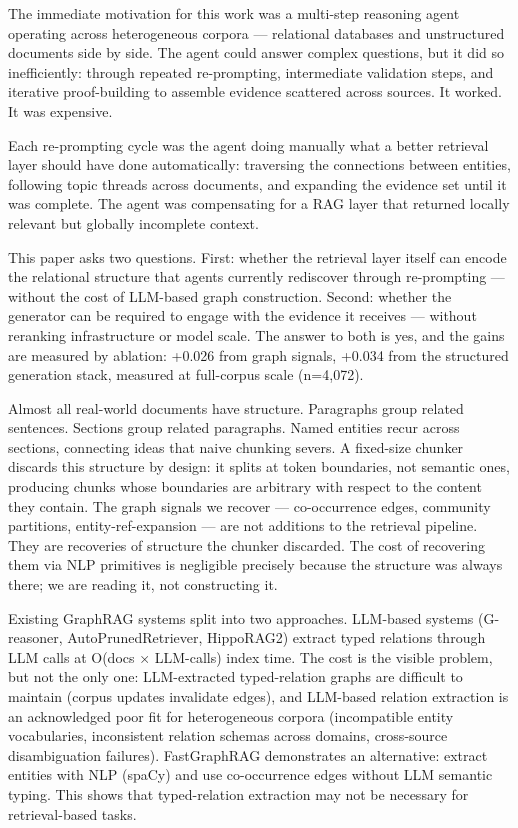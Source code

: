 The immediate motivation for this work was a multi-step reasoning agent operating across heterogeneous corpora --- relational databases and unstructured documents side by side. The agent could answer complex questions, but it did so inefficiently: through repeated re-prompting, intermediate validation steps, and iterative proof-building to assemble evidence scattered across sources. It worked. It was expensive.

Each re-prompting cycle was the agent doing manually what a better retrieval layer should have done automatically: traversing the connections between entities, following topic threads across documents, and expanding the evidence set until it was complete. The agent was compensating for a RAG layer that returned locally relevant but globally incomplete context.

This paper asks two questions. First: whether the retrieval layer itself can encode the relational structure that agents currently rediscover through re-prompting --- without the cost of LLM-based graph construction. Second: whether the generator can be required to engage with the evidence it receives --- without reranking infrastructure or model scale. The answer to both is yes, and the gains are measured by ablation: +0.026 from graph signals, +0.034 from the structured generation stack, measured at full-corpus scale (n=4,072).

Almost all real-world documents have structure. Paragraphs group related sentences. Sections group related paragraphs. Named entities recur across sections, connecting ideas that naive chunking severs. A fixed-size chunker discards this structure by design: it splits at token boundaries, not semantic ones, producing chunks whose boundaries are arbitrary with respect to the content they contain. The graph signals we recover --- co-occurrence edges, community partitions, entity-ref-expansion --- are not additions to the retrieval pipeline. They are recoveries of structure the chunker discarded. The cost of recovering them via NLP primitives is negligible precisely because the structure was always there; we are reading it, not constructing it.

Existing GraphRAG systems split into two approaches. LLM-based systems (G-reasoner, AutoPrunedRetriever, HippoRAG2) extract typed relations through LLM calls at O(docs × LLM-calls) index time. The cost is the visible problem, but not the only one: LLM-extracted typed-relation graphs are difficult to maintain (corpus updates invalidate edges), and LLM-based relation extraction is an acknowledged poor fit for heterogeneous corpora (incompatible entity vocabularies, inconsistent relation schemas across domains, cross-source disambiguation failures). FastGraphRAG demonstrates an alternative: extract entities with NLP (spaCy) and use co-occurrence edges without LLM semantic typing. This shows that typed-relation extraction may not be necessary for retrieval-based tasks.


